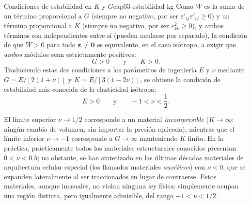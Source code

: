 \begin{ecnimportante}{Condiciones de estabilidad en $K$ y $G$}{cap03-estabilidad-kg}
Como $W$ es la suma de un término proporcional a $G$ (siempre no negativo, por ser $\varepsilon'_{ij}\varepsilon'_{ij}\geq 0$) y un término proporcional a $K$ (siempre no negativo, por ser $\varepsilon_{kk}^2\geq 0$), y ambos términos son independientes entre sí (pueden anularse por separado), la condición de que $W>0$ para todo $\bm\varepsilon\neq\bm 0$ es equivalente, en el caso isótropo, a exigir que \emph{ambos} módulos sean estrictamente positivos:
\[
G > 0 \qquad \text{y} \qquad K > 0.
\]
Traduciendo estas dos condiciones a los parámetros de ingeniería $E$ y $\nu$ mediante $G=E/[2(1+\nu)]$ y $K=E/[3(1-2\nu)]$, se obtiene la condición de estabilidad más conocida de la elasticidad isótropa:
\[
E > 0 \qquad \text{y} \qquad -1 < \nu < \frac{1}{2}.
\]
\end{ecnimportante}

\begin{observacion}
El límite superior $\nu\to 1/2$ corresponde a un material \emph{incompresible} ($K\to\infty$: ningún cambio de volumen, sin importar la presión aplicada), mientras que el límite inferior $\nu\to -1$ corresponde a $G\to\infty$ manteniendo $K$ finito. En la práctica, prácticamente todos los materiales estructurales conocidos presentan $0<\nu<0.5$; no obstante, se han sintetizado en las últimas décadas materiales de arquitectura celular especial (los llamados materiales \emph{auxéticos}) con $\nu<0$, que se expanden lateralmente al ser traccionados en lugar de contraerse. Estos materiales, aunque inusuales, no violan ninguna ley física: simplemente ocupan una región distinta, pero igualmente admisible, del rango $-1<\nu<1/2$.
\end{observacion}

